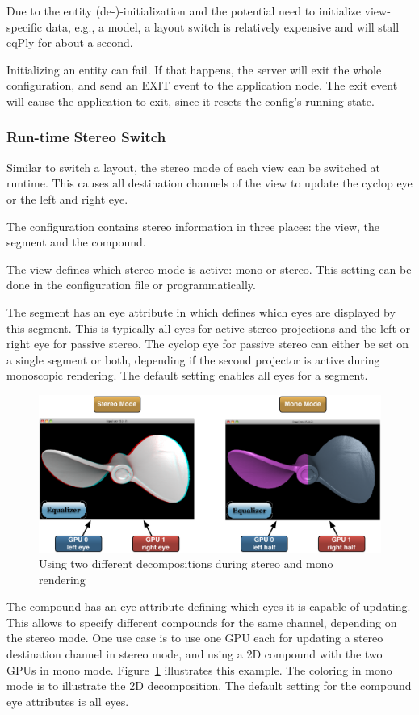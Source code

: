 \documentclass[10pt,a4]{scrartcl}
\newcommand{\fig}[1]{Figure~\ref{#1}}
\begin{document}
Due to the entity (de-)-initialization and the potential need to
initialize view-specific data, e.g., a model, a layout switch is
relatively expensive and will stall \textsf{eqPly} for about a second.

Initializing an entity can fail. If that happens, the server will exit
the whole configuration, and send an \textsf{EXIT} event to the
application node. The exit event will cause the application to exit,
since it resets the config's running state.

\subsubsection{Run-time Stereo Switch}

Similar to switch a layout, the stereo mode of each view can be switched at
runtime. This causes all destination channels of the view to update the cyclop
eye or the left and right eye.

The configuration contains stereo information in three places: the view, the
segment and the compound.

The view defines which stereo mode is active: mono or stereo. This setting can
be done in the configuration file or programmatically.

The segment has an \textsf{eye} attribute in which defines which eyes are
displayed by this segment. This is typically all eyes for active stereo
projections and the left or right eye for passive stereo. The cyclop eye for
passive stereo can either be set on a single segment or both, depending if the
second projector is active during monoscopic rendering. The default setting
enables all eyes for a segment.

\begin{figure}
  \includegraphics[width=.618\textwidth]{images/stereoSwitch.pdf}
  {\caption{\label{fStereoSwitch}Using two different decompositions during
      stereo and mono rendering}}
\end{figure}
The compound has an \textsf{eye} attribute defining which eyes it is capable of
updating. This allows to specify different compounds for the same channel,
depending on the stereo mode. One use case is to use one GPU each for updating a
stereo destination channel in stereo mode, and using a 2D compound with the two
GPUs in mono mode. \fig{fStereoSwitch} illustrates this example. The coloring in
mono mode is to illustrate the 2D decomposition. The default setting for the
compound eye attributes is all eyes.
\end{document}
